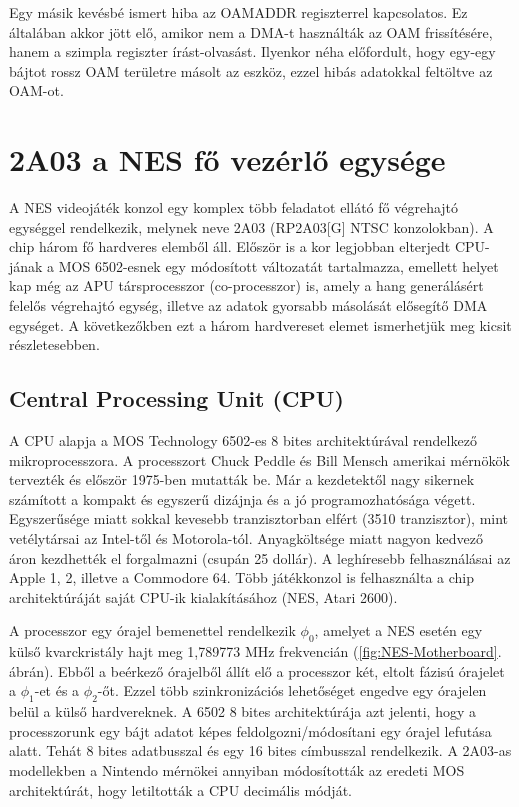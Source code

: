  	 Egy másik kevésbé ismert hiba az OAMADDR regiszterrel kapcsolatos. Ez általában akkor jött elő, amikor nem a DMA-t használták az OAM frissítésére, hanem a szimpla regiszter írást-olvasást. Ilyenkor néha előfordult, hogy egy-egy bájtot rossz OAM területre másolt az eszköz, ezzel hibás adatokkal feltöltve az OAM-ot.
 	 
 	       
\section{2A03 a NES fő vezérlő egysége}

A NES videojáték konzol egy komplex több feladatot ellátó fő végrehajtó egységgel rendelkezik, melynek neve 2A03 (RP2A03[G] NTSC konzolokban). A chip három fő hardveres elemből áll. Először is a kor legjobban elterjedt CPU-jának a MOS 6502-esnek egy módosított változatát tartalmazza, emellett helyet kap még az APU társprocesszor (co-processzor) is, amely a hang generálásért felelős végrehajtó egység, illetve az adatok gyorsabb másolását elősegítő DMA egységet. A következőkben ezt a három hardvereset elemet ismerhetjük meg kicsit részletesebben.

	\subsection{Central Processing Unit (CPU)}
	
	A CPU alapja a MOS Technology 6502-es 8 bites architektúrával rendelkező mikroprocesszora. A processzort Chuck Peddle és Bill Mensch amerikai mérnökök tervezték és először 1975-ben mutatták be. Már a kezdetektől nagy sikernek számított a kompakt és egyszerű dizájnja és a jó programozhatósága végett. Egyszerűsége miatt sokkal kevesebb tranzisztorban elfért (3510 tranzisztor), mint vetélytársai az Intel-től és Motorola-tól. Anyagköltsége miatt nagyon kedvező áron kezdhették el forgalmazni (csupán 25 dollár). A leghíresebb felhasználásai az Apple 1, 2, illetve a Commodore 64. Több játékkonzol is felhasználta a chip architektúráját saját CPU-ik kialakításához (NES, Atari 2600). 
	
	A processzor egy órajel bemenettel rendelkezik $\phi_0$, amelyet a NES esetén egy külső kvarckristály hajt meg 1,789773 MHz frekvencián (\ref{fig:NES-Motherboard}. ábrán). Ebből a beérkező órajelből állít elő a processzor két, eltolt fázisú órajelet a $\phi_1$-et és a $\phi_2$-őt. Ezzel több szinkronizációs lehetőséget engedve egy órajelen belül a külső hardvereknek. A 6502 8 bites architektúrája azt jelenti, hogy a processzorunk egy bájt adatot képes feldolgozni/módosítani egy órajel lefutása alatt. Tehát 8 bites adatbusszal és egy 16 bites címbusszal rendelkezik. A 2A03-as modellekben a Nintendo mérnökei annyiban módosították az eredeti MOS architektúrát, hogy letiltották a CPU decimális módját.

